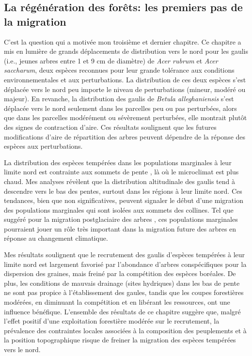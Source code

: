 \hypertarget{la-ruxe9guxe9nuxe9ration-des-foruxeats-les-premiers-pas-de-la-migration}{%
\subsection{La régénération des forêts: les premiers pas de la
migration}\label{la-ruxe9guxe9nuxe9ration-des-foruxeats-les-premiers-pas-de-la-migration}}

C'est la question qui a motivée mon troisième et dernier chapitre. Ce
chapitre a mis en lumière de grands déplacements de distribution vers le
nord pour les gaulis (i.e., jeunes arbres entre 1 et 9 cm de diamètre)
de \emph{Acer rubrum} et \emph{Acer saccharum}, deux espèces reconnues
pour leur grande tolérance aux conditions environnementales et aux
perturbations. La distribution de ces deux espèces s'est déplacée vers
le nord peu importe le niveau de perturbations (mineur, modéré ou
majeur). En revanche, la distribution des gaulis de \emph{Betula
alleghaniensis} s'est déplacée vers le nord seulement dans les parcelles
peu ou pas perturbées, alors que dans les parcelles modérément ou
sévèrement perturbées, elle montrait plutôt des signes de contraction
d'aire. Ces résultats soulignent que les futures modifications d'aire de
répartition des arbres peuvent dépendre de la réponse des espèces aux
perturbations.

La distribution des espèces tempérées dans les populations marginales à
leur limite nord est contrainte aux sommets de pente
\citep{goldblum_age_2002, tremblay_potential_2002, barras_supply_1998},
là où le microclimat est plus chaud. Mes analyses révèlent que la
distribution altitudinale des gaulis tend à descendre vers le bas des
pentes, surtout dans les régions à leur limite nord. Ces tendances, bien
que non significatives, peuvent signaler le début d'une migration des
populations marginales qui sont isolées aux sommets des collines. Tel
que suggéré pour la migration postglaciaire des arbres
\citep{mclachlan_molecular_2005}, ces populations marginales pourraient
jouer un rôle très important dans la migration future des arbres en
réponse au changement climatique.

Mes résultats soulignent que le recrutement des gaulis d'espèces
tempérées à leur limite nord est largement favorisé par l'abondance
d'arbres conspécifiques pour la dispersion des graines, mais freiné par
la compétition des espèces boréales. De plus, les conditions de mauvais
drainage (sites hydriques) dans les bas de pente ne sont pas propice à
l'établissement des gaules, tandis que les coupes forestières modérées,
en diminuant la compétition et en libérant les ressources, ont une
influence bénéfique. L'ensemble des résultats de ce chapitre suggère
que, malgré l'effet positif d'une exploitation forestière modérée sur le
recrutement, la prévalence des contraintes locales associées à la
composition des peuplements et à la position topographique risque de
freiner la migration des espèces tempérées vers le nord.

